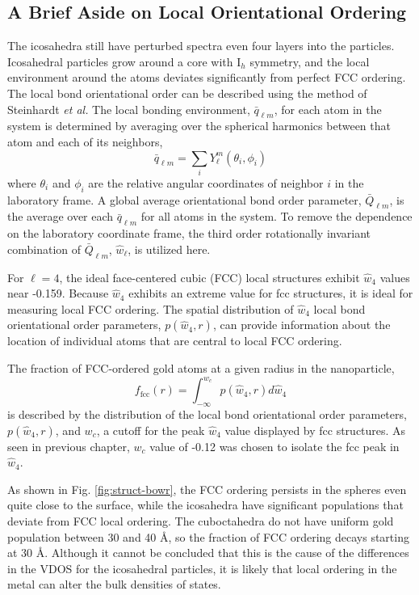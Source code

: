 \subsection{A Brief Aside on Local Orientational Ordering}
The icosahedra still have perturbed spectra even four layers into the
particles. Icosahedral particles grow around a core with
$\mathrm{I}_h$ symmetry, and the local environment around the atoms
deviates significantly from perfect FCC ordering.  The local bond
orientational order can be described using the method of Steinhardt
\textit{et al.}\cite{Steinhardt1983} 
The local bonding environment,
$\bar{q}_{\ell m}$, for each atom in the system is determined by
averaging over the spherical harmonics between that atom and each of
its neighbors,
\begin{equation}
\bar{q}_{\ell m} = \sum_i Y_\ell^m(\theta_i, \phi_i)
\end{equation}
where $\theta_i$ and $\phi_i$ are the relative angular coordinates of
neighbor $i$ in the laboratory frame.  A global average orientational
bond order parameter, $\bar{Q}_{\ell m}$, is the average over each
$\bar{q}_{\ell m}$ for all atoms in the system. To remove the
dependence on the laboratory coordinate frame, the third order
rotationally invariant combination of $\bar{Q}_{\ell m}$,
$\hat{w}_\ell$, is utilized here.\cite{Steinhardt1983,Vardeman:2008fk}

For $\ell=4$, the ideal face-centered cubic (FCC) local structures
exhibit $\hat{w}_4$ values near -0.159. Because $\hat{w}_4$ exhibits
an extreme value for fcc structures, it is ideal for measuring local
FCC ordering. The spatial distribution of $\hat{w}_4$ local bond
orientational order parameters, $p(\hat{w}_4 , r)$, can provide
information about the location of individual atoms that are central to
local FCC ordering.

The fraction of FCC-ordered gold atoms at a given radius in the
nanoparticle,
\begin{equation}
        f_\mathrm{fcc}(r) = \int_{-\infty}^{w_c} p(\hat{w}_4, r) d \hat{w}_4
\end{equation}
is described by the distribution of the local bond orientational order
parameters, $p(\hat{w}_4, r)$, and $w_c$, a cutoff for the peak
$\hat{w}_4$ value displayed by fcc structures. As seen in previous
chapter,\cite{Stocker2016} $w_c$ value of -0.12 was chosen to isolate the
fcc peak in $\hat{w}_4$.

As shown in Fig. \ref{fig:struct-bowr}, the FCC ordering persists in
the spheres even quite close to the surface, while the icosahedra have
significant populations that deviate from FCC local ordering.  The
cuboctahedra do not have uniform gold population between 30 and 40
\AA, so the fraction of FCC ordering decays starting at 30 \AA.
Although it cannot be concluded that this is the cause of the differences
in the VDOS for the icosahedral particles, it is likely that local
ordering in the metal can alter the bulk densities of states.

